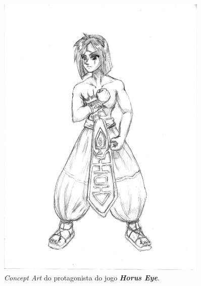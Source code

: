 \documentclass[12pt,onecolumn,a4paper]{article}
\begin{document}
        \begin{figure}[htb]
            \centering
            \includegraphics[width=0.9\textwidth]{images/concept_hero.jpg}
            \caption{\textit{Concept Art} do protagonista do jogo \textit{\textbf{Horus Eye}}.}
            \label{fig:concept_01}
        \end{figure}
        
\end{document}
